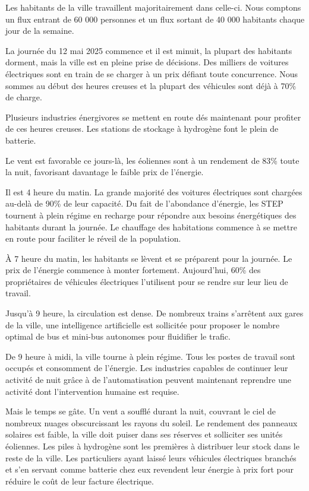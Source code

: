 Les habitants de la ville travaillent majoritairement dans celle-ci.
Nous comptons un flux entrant de 60 000 personnes et un flux sortant de 40 000 habitants chaque jour
de la semaine.

La journée du 12 mai 2025 commence et il est minuit, la plupart des habitants dorment, mais
la ville est en pleine prise de décisions.
Des milliers de voitures électriques sont en train de se charger à un prix défiant toute concurrence.
Nous sommes au début des heures creuses et la plupart des véhicules sont déjà à 70\% de charge.

Plusieurs industries énergivores se mettent en route dés maintenant pour profiter de ces heures creuses.
Les stations de stockage à hydrogène font le plein de batterie.

Le vent est favorable ce jours-là, les éoliennes sont à un rendement de 83\% toute la nuit,
favorisant davantage le faible prix de l'énergie.

Il est 4 heure du matin. La grande majorité des voitures électriques sont chargées au-delà de 90\% de leur capacité.
Du fait de l'abondance d'énergie, les STEP tournent à plein régime en recharge pour répondre aux besoins
énergétiques des habitants durant la journée.
Le chauffage des habitations commence à se mettre en route pour faciliter le réveil de la population.

À 7 heure du matin, les habitants se lèvent et se préparent pour la journée. Le prix de l'énergie commence à monter
fortement. Aujourd'hui, 60\% des propriétaires de véhicules électriques l'utilisent pour se rendre sur leur lieu de travail.

Jusqu'à 9 heure, la circulation est dense. De nombreux trains s'arrêtent aux gares de la ville,
une intelligence artificielle est sollicitée pour proposer le nombre optimal
de bus et mini-bus autonomes pour fluidifier le trafic.

De 9 heure à midi, la ville tourne à plein régime. Tous les postes de travail sont occupés et consomment de l'énergie.
Les industries capables de continuer leur activité de nuit grâce à de l'automatisation peuvent maintenant
reprendre une activité dont l'intervention humaine est requise.

Mais le temps se gâte. Un vent a soufflé durant la nuit, couvrant le ciel de nombreux nuages obscurcissant
les rayons du soleil. Le rendement des panneaux solaires est faible, la ville doit puiser dans
ses réserves et solliciter ses unités éoliennes.
Les piles à hydrogène sont les premières à distribuer leur stock dans le reste de la ville.
Les particuliers ayant laissé leurs véhicules électriques branchés et s'en servant comme batterie chez eux revendent
leur énergie à prix fort pour réduire le coût de leur facture électrique.

